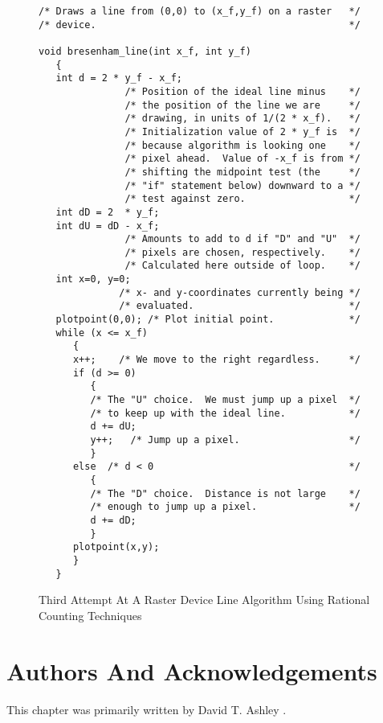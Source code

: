 \begin{figure}
\begin{verbatim}
/* Draws a line from (0,0) to (x_f,y_f) on a raster   */
/* device.                                            */

void bresenham_line(int x_f, int y_f)
   {
   int d = 2 * y_f - x_f;  
               /* Position of the ideal line minus    */
               /* the position of the line we are     */
               /* drawing, in units of 1/(2 * x_f).   */
               /* Initialization value of 2 * y_f is  */
               /* because algorithm is looking one    */
               /* pixel ahead.  Value of -x_f is from */
               /* shifting the midpoint test (the     */
               /* "if" statement below) downward to a */
               /* test against zero.                  */
   int dD = 2  * y_f;
   int dU = dD - x_f;
               /* Amounts to add to d if "D" and "U"  */
               /* pixels are chosen, respectively.    */
               /* Calculated here outside of loop.    */
   int x=0, y=0;
              /* x- and y-coordinates currently being */
              /* evaluated.                           */
   plotpoint(0,0); /* Plot initial point.             */
   while (x <= x_f)
      {
      x++;    /* We move to the right regardless.     */
      if (d >= 0)
         {
         /* The "U" choice.  We must jump up a pixel  */
         /* to keep up with the ideal line.           */
         d += dU;
         y++;   /* Jump up a pixel.                   */
         }
      else  /* d < 0                                  */
         {
         /* The "D" choice.  Distance is not large    */
         /* enough to jump up a pixel.                */
         d += dD;
         }
      plotpoint(x,y);
      }
   }
\end{verbatim}
\caption{Third Attempt At A Raster Device Line Algorithm
         Using Rational Counting Techniques}
\label{fig:crat0:sbla0:04}
\end{figure}


\section{Authors And Acknowledgements}
This chapter was primarily written by
    David T. Ashley
\cite{bibref:i:daveashley}.

